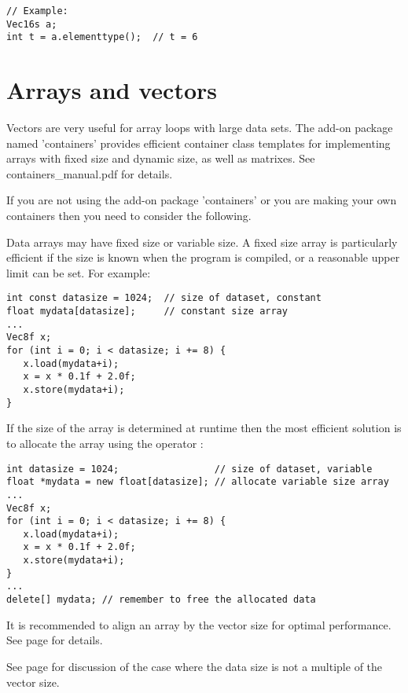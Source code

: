 \documentclass[vcl_manual.tex]{subfiles}
\begin{document}
\begin{lstlisting}[frame=none]
// Example:
Vec16s a;
int t = a.elementtype();  // t = 6
\end{lstlisting}


{}


\section{Arrays and vectors} \label{ArraysOfVectors}
Vectors are very useful for array loops with large data sets. 
The add-on package named 'containers' provides efficient container class templates for implementing arrays with fixed size and dynamic size, as well as matrixes. 
See containers\_manual.pdf for details.

If you are not using the add-on package 'containers' or you are making your own containers then you need to consider the following.

Data arrays may have fixed size or variable size. A fixed size array is particularly efficient if the size is known when the program is compiled, or a reasonable upper limit can be set. For example:

\begin{lstlisting}[frame=none]
int const datasize = 1024;  // size of dataset, constant
float mydata[datasize];     // constant size array
...
Vec8f x;
for (int i = 0; i < datasize; i += 8) {
   x.load(mydata+i);
   x = x * 0.1f + 2.0f;
   x.store(mydata+i);
}
\end{lstlisting}

If the size of the array is determined at runtime then the most efficient solution is to allocate the array using the operator :

\begin{lstlisting}[frame=none]
int datasize = 1024;                 // size of dataset, variable
float *mydata = new float[datasize]; // allocate variable size array
...
Vec8f x;
for (int i = 0; i < datasize; i += 8) {
   x.load(mydata+i);
   x = x * 0.1f + 2.0f;
   x.store(mydata+i);
}
...
delete[] mydata; // remember to free the allocated data
\end{lstlisting}

It is recommended to align an array by the vector size for optimal performance. See page \pageref{Alignment} for details.

See page \pageref{NotAMultipleOfVectorSize} for discussion of the case where the data size is not a multiple of the vector size.
\end{document}
